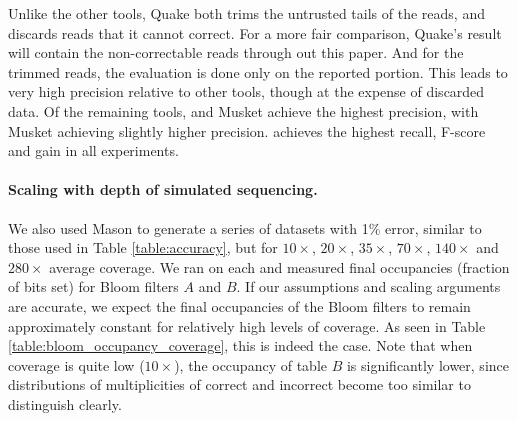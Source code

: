 \documentclass[10pt]{article}
\begin{document}
Unlike the other tools, Quake both trims the untrusted tails of the reads, and discards reads that it cannot correct. For a more fair comparison, Quake's result will contain the non-correctable reads through out this paper. And for the trimmed reads, the evaluation is done only on the reported portion. This leads to very high precision relative to other tools, though at the expense of discarded data.  Of the remaining tools, \tool and Musket achieve the highest precision, with Musket achieving slightly higher precision.  \tool achieves the highest recall, F-score and gain in all experiments.

\paragraph{Scaling with depth of simulated sequencing.} We also used Mason to generate a series of datasets with 1\% error, similar to those used in Table \ref{table:accuracy}, but for $10\times$, $20\times$, $35\times$, $70\times$, $140\times$ and $280\times$ average coverage.  We ran \tool on each and measured final occupancies (fraction of bits set) for Bloom filters $A$ and $B$.  If our assumptions and scaling arguments are accurate, we expect the final occupancies of the Bloom filters to remain approximately constant for relatively high levels of coverage.  As seen in Table \ref{table:bloom_occupancy_coverage}, this is indeed the case.  Note that when coverage is quite low ($10\times$), the occupancy of table $B$ is significantly lower, since distributions of multiplicities of correct and incorrect \kmers become too similar to distinguish clearly.


\end{document}
